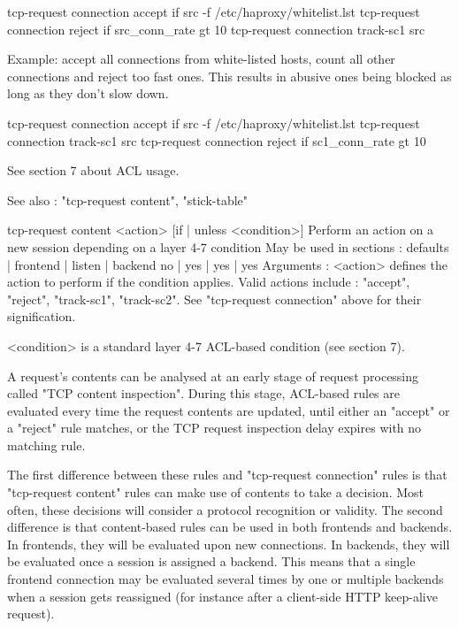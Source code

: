        tcp-request connection accept if { src -f /etc/haproxy/whitelist.lst }
        tcp-request connection reject if { src_conn_rate gt 10 }
        tcp-request connection track-sc1 src

  Example: accept all connections from white-listed hosts, count all other
           connections and reject too fast ones. This results in abusive ones
           being blocked as long as they don't slow down.

        tcp-request connection accept if { src -f /etc/haproxy/whitelist.lst }
        tcp-request connection track-sc1 src
        tcp-request connection reject if { sc1_conn_rate gt 10 }

  See section 7 about ACL usage.

  See also : "tcp-request content", "stick-table"


tcp-request content <action> [{if | unless} <condition>]
  Perform an action on a new session depending on a layer 4-7 condition
  May be used in sections :   defaults | frontend | listen | backend
                                 no    |    yes   |   yes  |   yes
  Arguments :
    <action>    defines the action to perform if the condition applies. Valid
                actions include : "accept", "reject", "track-sc1", "track-sc2".
                See "tcp-request connection" above for their signification.

    <condition> is a standard layer 4-7 ACL-based condition (see section 7).

  A request's contents can be analysed at an early stage of request processing
  called "TCP content inspection". During this stage, ACL-based rules are
  evaluated every time the request contents are updated, until either an
  "accept" or a "reject" rule matches, or the TCP request inspection delay
  expires with no matching rule.

  The first difference between these rules and "tcp-request connection" rules
  is that "tcp-request content" rules can make use of contents to take a
  decision. Most often, these decisions will consider a protocol recognition or
  validity. The second difference is that content-based rules can be used in
  both frontends and backends. In frontends, they will be evaluated upon new
  connections. In backends, they will be evaluated once a session is assigned
  a backend. This means that a single frontend connection may be evaluated
  several times by one or multiple backends when a session gets reassigned
  (for instance after a client-side HTTP keep-alive request).

